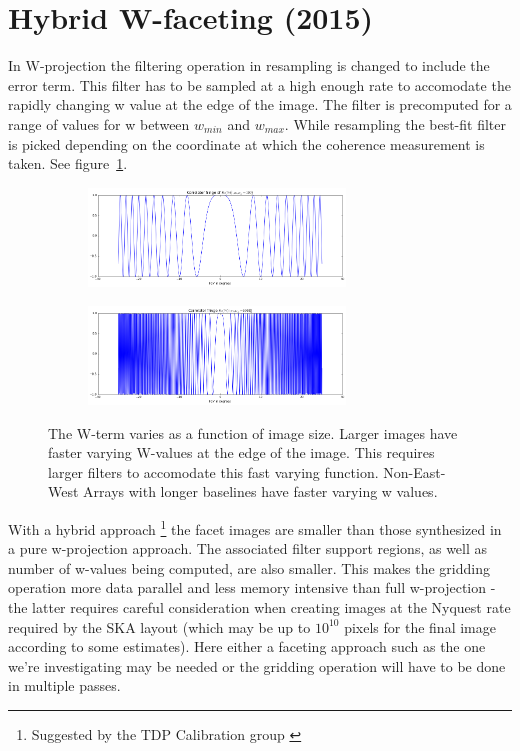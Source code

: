\documentclass[a4paper,10pt]{article}
\begin{document}
\section{Hybrid W-faceting (2015)}
In W-projection \cite{cornwell2008noncoplanar} the filtering operation in resampling is changed to include the error term. This filter has to be sampled
at a high enough rate to accomodate the rapidly changing w value at the edge of the image. The filter is precomputed for a
range of values for w between $w_{min}$ and $w_{max}$. While resampling the best-fit filter is picked depending on the
coordinate at which the coherence measurement is taken. See figure~\ref{FIG_W}.
\begin{figure}[h!]
 \centering
 \begin{subfigure}[b]{0.75\textwidth}
    \centering
    \includegraphics[width=0.75\textwidth]{images/w100.png}
 \end{subfigure}
 \begin{subfigure}[b]{0.75\textwidth}
    \centering
    \includegraphics[width=0.75\textwidth]{images/w1000.png}
 \end{subfigure}
 \caption[W as a function of image size]{The W-term varies as a function of image size. Larger images have faster varying
 W-values at the edge of the image. This requires larger filters to accomodate this fast varying function. Non-East-West 
 Arrays with longer baselines have faster varying w values.}
 \label{FIG_W}
\end{figure}

With a hybrid approach \footnote{Suggested by the TDP Calibration group \cite{yashar2009tdp}} the facet images are smaller than those synthesized in a pure 
w-projection approach. The associated filter support regions, as well as number of w-values being computed, are also smaller. This 
makes the gridding operation more data parallel and less memory intensive than full w-projection - the latter requires careful consideration when creating 
images at the Nyquest rate required by the SKA layout (which may be up to $10^{10}$ pixels for the final image according to some estimates). 
Here either a faceting approach such as the one we're investigating may be needed or the gridding operation will have to be done in 
multiple passes.
\end{document}
